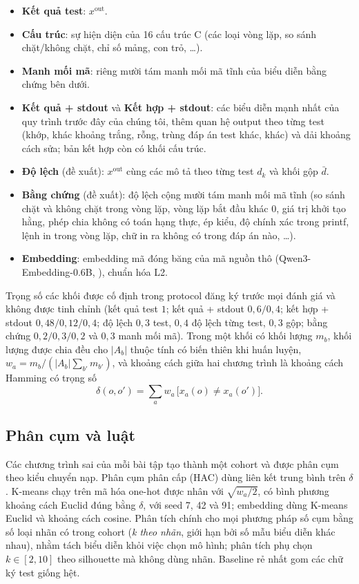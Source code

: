 \begin{itemize}
\item \textbf{Kết quả test}: $x^{\mathrm{out}}$.
\item \textbf{Cấu trúc}: sự hiện diện của 16 cấu trúc C (các loại vòng lặp, so sánh chặt/không chặt, chỉ số mảng, con trỏ, \dots).
\item \textbf{Manh mối mã}: riêng mười tám manh mối mã tĩnh của biểu diễn bằng chứng bên dưới.
\item \textbf{Kết quả + stdout} và \textbf{Kết hợp + stdout}: các biểu diễn mạnh nhất của quy trình trước đây của chúng tôi, thêm quan hệ output theo từng test (khớp, khác khoảng trắng, rỗng, trùng đáp án test khác, khác) và dải khoảng cách sửa; bản kết hợp còn có khối cấu trúc.
\item \textbf{Độ lệch} (đề xuất): $x^{\mathrm{out}}$ cùng các mô tả theo từng test $d_k$ và khối gộp $\bar d$.
\item \textbf{Bằng chứng} (đề xuất): độ lệch cộng mười tám manh mối mã tĩnh (so sánh chặt và không chặt trong vòng lặp, vòng lặp bắt đầu khác 0, giá trị khởi tạo hằng, phép chia không có toán hạng thực, ép kiểu, độ chính xác trong printf, lệnh in trong vòng lặp, chữ in ra không có trong đáp án nào, \dots).
\item \textbf{Embedding}: embedding mã đóng băng của mã nguồn thô (Qwen3-Embedding-0.6B, \citealt{zhang2025qwen3embedding}), chuẩn hóa L2.
\end{itemize}
Trọng số các khối được cố định trong protocol đăng ký trước mọi đánh giá và không được tinh chỉnh (kết quả test $1$; kết quả + stdout $0{,}6/0{,}4$; kết hợp + stdout $0{,}48/0{,}12/0{,}4$; độ lệch $0{,}3$ test, $0{,}4$ độ lệch từng test, $0{,}3$ gộp; bằng chứng $0{,}2/0{,}3/0{,}2$ và $0{,}3$ manh mối mã). Trong một khối có khối lượng $m_b$, khối lượng được chia đều cho $|A_b|$ thuộc tính có biến thiên khi huấn luyện, $w_a = m_b / (|A_b| \sum_{b'} m_{b'})$, và khoảng cách giữa hai chương trình là khoảng cách Hamming có trọng số
\begin{equation}
\delta(o, o') = \sum_{a} w_a \,\bigl[x_a(o) \neq x_a(o')\bigr].
\end{equation}

\subsection{Phân cụm và luật}
Các chương trình sai của mỗi bài tập tạo thành một cohort và được phân cụm theo kiểu chuyển nạp. Phân cụm phân cấp (HAC) dùng liên kết trung bình trên $\delta$. K-means chạy trên mã hóa one-hot được nhân với $\sqrt{w_a/2}$, có bình phương khoảng cách Euclid đúng bằng $\delta$, với seed 7, 42 và 91; embedding dùng K-means Euclid và khoảng cách cosine. Phân tích chính cho mọi phương pháp số cụm bằng số loại nhãn có trong cohort (\emph{k theo nhãn}, giới hạn bởi số mẫu biểu diễn khác nhau), nhằm tách biểu diễn khỏi việc chọn mô hình; phân tích phụ chọn $k\in[2,10]$ theo silhouette mà không dùng nhãn. Baseline rẻ nhất gom các chữ ký test giống hệt.


